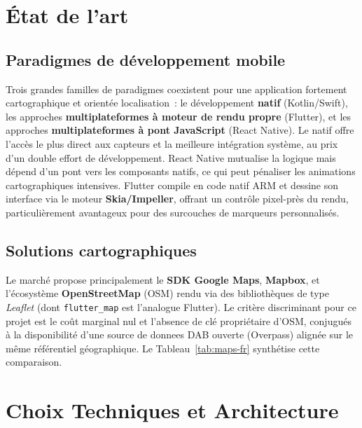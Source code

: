 \documentclass[11pt,a4paper]{article}
\newcommand{\code}[1]{\texttt{#1}}
\begin{document}
\section{\'Etat de l'art}
\subsection{Paradigmes de d\'eveloppement mobile}
Trois grandes familles de paradigmes coexistent pour une application fortement
cartographique et orient\'ee localisation~: le d\'eveloppement \textbf{natif}
(Kotlin/Swift), les approches \textbf{multiplateformes \`a moteur de rendu
propre} (Flutter), et les approches \textbf{multiplateformes \`a pont JavaScript}
(React Native). Le natif offre l'acc\`es le plus direct aux capteurs et la
meilleure int\'egration syst\`eme, au prix d'un double effort de
d\'eveloppement. React Native mutualise la logique mais d\'epend d'un pont vers
les composants natifs, ce qui peut p\'enaliser les animations cartographiques
intensives. Flutter compile en code natif ARM et dessine son interface via le
moteur \textbf{Skia/Impeller}, offrant un contr\^ole pixel-pr\`es du rendu,
particuli\`erement avantageux pour des surcouches de marqueurs personnalis\'es.

\subsection{Solutions cartographiques}
Le march\'e propose principalement le \textbf{SDK Google Maps}, \textbf{Mapbox},
et l'\'ecosyst\`eme \textbf{OpenStreetMap} (OSM) rendu via des biblioth\`eques
de type \emph{Leaflet} (dont \code{flutter\_map} est l'analogue Flutter). Le
crit\`ere discriminant pour ce projet est le co\^ut marginal nul et l'absence de
cl\'e propri\'etaire d'OSM, conjugu\'es \`a la disponibilit\'e d'une source de
donnees DAB ouverte (Overpass) align\'ee sur le m\^eme r\'ef\'erentiel
g\'eographique. Le Tableau~\ref{tab:maps-fr} synth\'etise cette comparaison.

\section{Choix Techniques et Architecture}
\end{document}
